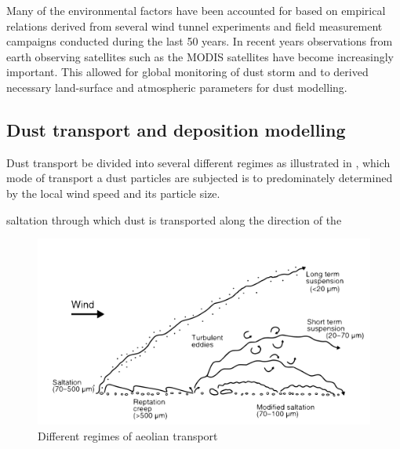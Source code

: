 Many of the environmental factors have been accounted for based on empirical relations derived from several wind tunnel experiments and field measurement campaigns conducted during the last 50 years. In recent years observations from earth observing satellites such as the MODIS satellites have become increasingly important. This allowed for global monitoring of dust storm and to derived necessary land-surface and atmospheric parameters for dust modelling.  




\subsection{Dust transport and deposition modelling}
Dust transport be divided into several different regimes as illustrated in , which mode of transport a dust particles are subjected is to predominately determined by the local wind speed and its particle size.

saltation through which dust is transported along the direction of the  

\begin{figure}[htbp]
  \centering
  \includegraphics[width = \textwidth]{texfiles/figs/aeolian_transport_Parsons_Abrahams.pdf}
  \caption{Different regimes of aeolian transport \parencite{nickling2009aeolian}}
  \label{fig:modes_of_dust_transport}
\end{figure}


